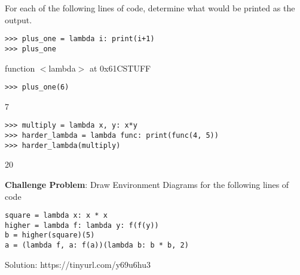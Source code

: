\question 
For each of the following lines of code, determine what would be printed as the output. \newline
\begin{lstlisting}
>>> plus_one = lambda i: print(i+1)
>>> plus_one
\end{lstlisting}
\begin{solution}[0.25in]
function $<$lambda$>$ at 0x61CSTUFF
\end{solution}
\begin{lstlisting}
>>> plus_one(6)
\end{lstlisting}
\begin{solution}[0.25in]
7
\end{solution}
\begin{lstlisting}
>>> multiply = lambda x, y: x*y
>>> harder_lambda = lambda func: print(func(4, 5))
>>> harder_lambda(multiply)
\end{lstlisting}
\begin{solution}[0.25in]
20
\end{solution}


\question 
\textbf{Challenge Problem}: 
Draw Environment Diagrams for the following lines of code
\begin{lstlisting}
square = lambda x: x * x
higher = lambda f: lambda y: f(f(y))
b = higher(square)(5)
a = (lambda f, a: f(a))(lambda b: b * b, 2)
\end{lstlisting}
\begin{solution}
Solution: https://tinyurl.com/y69u6hu3
\end{solution}
